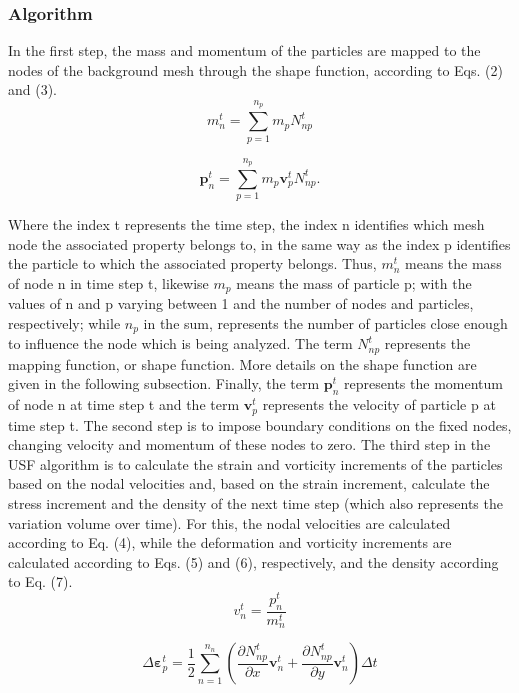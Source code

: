 \documentclass[preprint,12pt]{elsarticle}
\begin{document}
\subsubsection{Algorithm}
In the first step, the mass and momentum of the particles are mapped to the nodes of the background mesh through the shape function, according to Eqs. (2) and (3).
\begin{equation}
m_n^t = \sum_{p=1}^{n_{p}} m_pN_{np}^{t}
\end{equation}

\begin{equation}
\boldsymbol{p}_{n}^{t} = \sum_{p=1}^{n_p}m_p \boldsymbol{v}_p^tN_{np}^t.
\end{equation}

Where the index t represents the time step, the index n identifies which mesh node the associated property belongs to, in the same way as the index p identifies the particle to which the associated property belongs. Thus, $m_n^t$ means the mass of node n in time step t, likewise $m_p$ means the mass of particle p; with the values of n and p varying between 1 and the number of nodes and particles, respectively; while $n_p$ in the sum, represents the number of particles close enough to influence the node which is being analyzed. The term $N_{np}^t$ represents the mapping function, or shape function. More details on the shape function are given in the following subsection. Finally, the term $\boldsymbol{p}_n^t$ represents the momentum of node n at time step t and the term $\boldsymbol{v}_p^t$ represents the velocity of particle p at time step t.
The second step is to impose boundary conditions on the fixed nodes, changing velocity and momentum of these nodes to zero. The third step in the USF algorithm is to calculate the strain and vorticity increments of the particles based on the nodal velocities and, based on the strain increment, calculate the stress increment and the density of the next time step (which also represents the variation volume over time). For this, the nodal velocities are calculated according to Eq. (4), while the deformation and vorticity increments are calculated according to Eqs. (5) and (6), respectively, and the density according to Eq. (7).
\begin{equation}
v_n^t = \frac{p_n^t}{m_n^t}
\end{equation}

\begin{equation}
\Delta\boldsymbol{\varepsilon}_p^t = \frac{1}{2}\sum_{n=1}^{n_n}\left ( \frac{\partial N_{np}^t}{\partial x}\boldsymbol{v}_n^t+\frac{\partial N_{np}^t}{\partial y}\boldsymbol{v}_n^t \right )\Delta t 
\end{equation}
\end{document}

